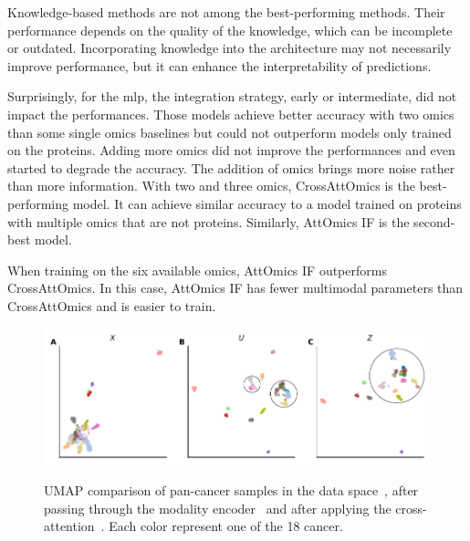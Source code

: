 \documentclass[../main.tex]{subfiles}
\begin{document}
	    Knowledge-based methods are not among the best-performing methods.
	    Their performance depends on the quality of the knowledge, which can be incomplete or outdated.
	    Incorporating knowledge into the architecture may not necessarily improve performance, but it can enhance the interpretability of predictions.

	    Surprisingly, for the \gls{mlp}, the integration strategy, early or intermediate, did not impact the performances.
	    Those models achieve better accuracy with two omics than some single omics baselines but could not outperform models only trained on the proteins.
	    Adding more omics did not improve the performances and even started to degrade the accuracy.
	    The addition of omics brings more noise rather than more information.
	    With two and three omics, CrossAttOmics is the best-performing model.
	    It can achieve similar accuracy to a model trained on proteins with multiple omics that are not proteins.
	    Similarly, AttOmics IF is the second-best model.

	    When training on the six available omics, AttOmics IF outperforms CrossAttOmics.
	    In this case, AttOmics IF has fewer multimodal parameters than CrossAttOmics and is easier to train.

	    \begin{figure}
	        \centering
	        \begin{subcaptiongroup}
	            \includegraphics{umap_mRNA.pdf}
	            \label{fig:umap_mrna_A}
	            \label{fig:umap_mrna_B}
	            \label{fig:umap_mrna_C}
	        \end{subcaptiongroup}
	        \caption[UMAP comparison of pan-cancer samples]{UMAP comparison of pan-cancer samples in the data space~, after passing through the modality encoder~ and after applying the cross-attention~. Each color represent one of the 18 cancer. }
	        \label{fig:umap_mrna}
	    \end{figure}
\end{document}
